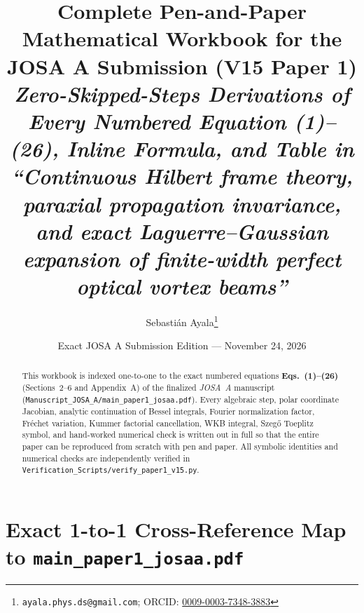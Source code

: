 \documentclass[10pt,letterpaper]{article}
\title{\vspace{-1.0cm}\textbf{\Large Complete Pen-and-Paper Mathematical Workbook for the JOSA A Submission (V15 Paper 1)}\\[0.35em]
\large\textit{Zero-Skipped-Steps Derivations of Every Numbered Equation (1)--(26), Inline Formula, and Table in\\
``Continuous Hilbert frame theory, paraxial propagation invariance, and exact Laguerre--Gaussian expansion of finite-width perfect optical vortex beams''}}
\author{Sebasti\'an Ayala\thanks{\texttt{ayala.phys.ds@gmail.com}; ORCID: \href{https://orcid.org/0009-0003-7348-3883}{0009-0003-7348-3883}}}
\date{Exact JOSA A Submission Edition --- November 24, 2026}
\numberwithin{equation}{section}
\begin{document}
\maketitle
\thispagestyle{plain}

\begin{abstract}
\noindent This workbook is indexed one-to-one to the exact numbered equations \textbf{Eqs.~(1)--(26)} (Sections~2--6 and Appendix~A) of the finalized \emph{JOSA~A} manuscript (\texttt{Manuscript\_JOSA\_A/main\_paper1\_josaa.pdf}). Every algebraic step, polar coordinate Jacobian, analytic continuation of Bessel integrals, Fourier normalization factor, Fr\'echet variation, Kummer factorial cancellation, WKB integral, Szeg\H{o} Toeplitz symbol, and hand-worked numerical check is written out in full so that the entire paper can be reproduced from scratch with pen and paper. All symbolic identities and numerical checks are independently verified in \texttt{Verification\_Scripts/verify\_paper1\_v15.py}.
\end{abstract}

\tableofcontents
\vspace{0.5em}

\section*{Exact 1-to-1 Cross-Reference Map to \texttt{main\_paper1\_josaa.pdf}}
\end{document}
